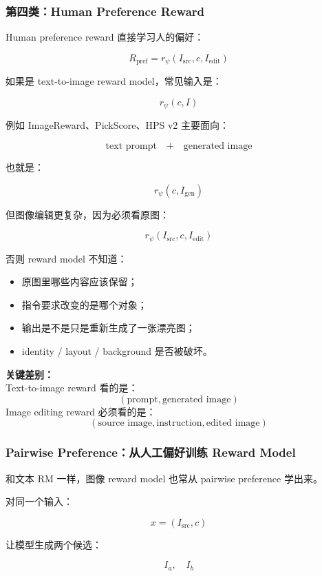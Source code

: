 \subsubsection{第四类：Human Preference Reward}

Human preference reward 直接学习人的偏好：

\[
R_\text{pref}
=
r_\psi(I_\text{src},c,I_\text{edit})
\]

如果是 text-to-image reward model，常见输入是：

\[
r_\psi(c,I)
\]

例如 ImageReward、PickScore、HPS v2 主要面向：

\[
\text{text prompt}
\quad+\quad
\text{generated image}
\]

也就是：

\[
r_\psi(c,I_\text{gen})
\]

但图像编辑更复杂，因为必须看原图：

\[
r_\psi(I_\text{src},c,I_\text{edit})
\]

否则 reward model 不知道：

\begin{itemize}[leftmargin=1.5em]
  \item 原图里哪些内容应该保留；
  \item 指令要求改变的是哪个对象；
  \item 输出是不是只是重新生成了一张漂亮图；
  \item identity / layout / background 是否被破坏。
\end{itemize}

\begin{summarybox}
\textbf{关键差别：}\\
Text-to-image reward 看的是：
\[
(\text{prompt}, \text{generated image})
\]
Image editing reward 必须看的是：
\[
(\text{source image}, \text{instruction}, \text{edited image})
\]
\end{summarybox}

\subsubsection{Pairwise Preference：从人工偏好训练 Reward Model}

和文本 RM 一样，图像 reward model 也常从 pairwise preference 学出来。

对同一个输入：

\[
x=(I_\text{src},c)
\]

让模型生成两个候选：

\[
I_a,\quad I_b
\]

